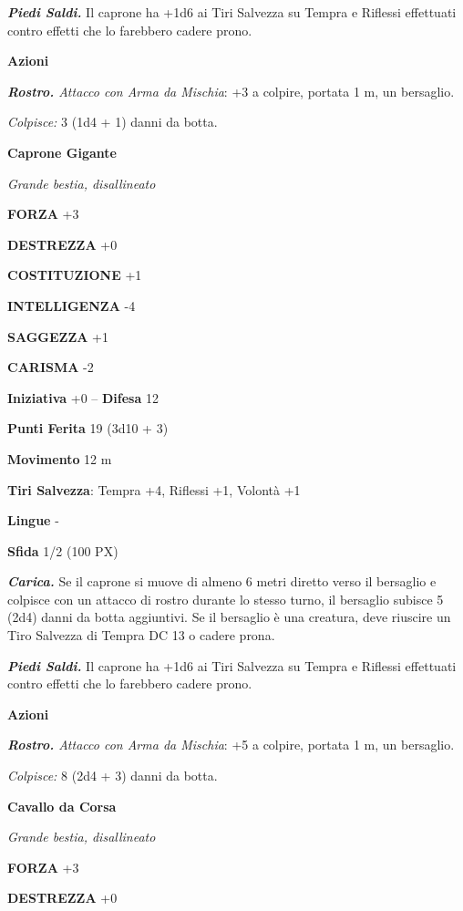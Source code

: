 \begin{multicols}{2}
	\textit{\textbf{Piedi Saldi.}} Il caprone ha +1d6 ai Tiri Salvezza su Tempra e Riflessi effettuati contro effetti che lo farebbero cadere prono.

	\textbf{Azioni}

	\textit{\textbf{Rostro.} Attacco con Arma da Mischia}: +3 a colpire, portata 1 m, un bersaglio.

	\textit{Colpisce:} 3 (1d4 + 1) danni da botta.

	\medskip\textbf{Caprone Gigante}

	\textit{Grande bestia, disallineato}

	\textbf{FORZA} +3

	\textbf{DESTREZZA} +0

	\textbf{COSTITUZIONE} +1

	\textbf{INTELLIGENZA} -4

	\textbf{SAGGEZZA} +1

	\textbf{CARISMA} -2

	\textbf{Iniziativa} +0 -- \textbf{Difesa} 12

	\textbf{Punti Ferita} 19 (3d10 + 3)

	\textbf{Movimento} 12 m

	\textbf{Tiri Salvezza}: Tempra +4, Riflessi +1, Volontà +1

	\textbf{Lingue} -

	\textbf{Sfida} 1/2 (100 PX)

	\textit{\textbf{Carica.}} Se il caprone si muove di almeno 6 metri diretto verso il bersaglio e colpisce con un attacco di rostro durante lo stesso turno, il bersaglio subisce 5 (2d4) danni da botta aggiuntivi. Se il bersaglio è una creatura, deve riuscire un Tiro Salvezza di Tempra DC 13 o cadere prona.

	\textit{\textbf{Piedi Saldi.}} Il caprone ha +1d6 ai Tiri Salvezza su Tempra e Riflessi effettuati contro effetti che lo farebbero cadere prono.

	\textbf{Azioni}

	\textit{\textbf{Rostro.} Attacco con Arma da Mischia}: +5 a colpire, portata 1 m, un bersaglio.

	\textit{Colpisce:} 8 (2d4 + 3) danni da botta.

	\medskip\textbf{Cavallo da Corsa}

	\textit{Grande bestia, disallineato}

	\textbf{FORZA} +3

	\textbf{DESTREZZA} +0


\end{multicols}
